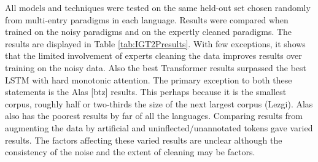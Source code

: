 All models and techniques were tested on the same held-out set chosen randomly from multi-entry paradigms in each language. Results were compared when trained on the noisy paradigms and on the expertly cleaned paradigms. The results are displayed in Table \ref{tab:IGT2Presults}. With few exceptions, it shows that the limited involvement of experts cleaning the data improves results over training on the noisy data. Also the best Transformer results surpassed the best LSTM with hard monotonic attention. The primary exception to both these statements is the Alas [btz] results. This perhaps because it is the smallest corpus, roughly half or two-thirds the size of the next largest corpus (Lezgi). Alas also has the poorest results by far of all the languages.
Comparing results from augmenting the data by artificial and uninflected/unannotated tokens gave varied results. The factors affecting these varied results are unclear although the consistency of the noise and the extent of cleaning may be factors. 


